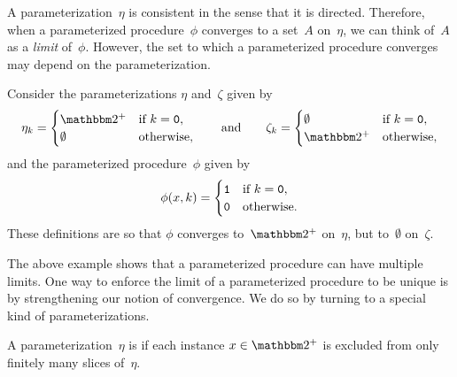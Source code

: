 A parameterization~$\eta$ is consistent in the sense that it is directed.
Therefore, when a parameterized procedure~$\phi$ converges to a set~$A$ on~$\eta$, we can think of~$A$ as a \emph{limit} of~$\phi$.
However, the set to which a parameterized procedure converges may depend on the parameterization.
\begin{example}
\label{ex:convergence}%
  Consider the parameterizations $\eta$ and~$\zeta$ given by
  \begin{equation*}
    \eta_k \deq \begin{cases}
      \binary^+	& \text{if $k = \bits{0}$}, \\
      \emptyset	& \text{otherwise},
    \end{cases}
    \qquad\text{and}\qquad
    \zeta_k \deq \begin{cases}
      \emptyset	& \text{if $k = \bits{0}$}, \\
      \binary^+	& \text{otherwise},
    \end{cases}
  \end{equation*}
  and the parameterized procedure~$\phi$ given by
  \begin{equation*}
    \phi(x, k) = \begin{cases}
      \textnormal{\texttt{1}}	& \text{if $k = \textnormal{\texttt{0}}$}, \\
      \textnormal{\texttt{0}}	& \text{otherwise}.
    \end{cases}
  \end{equation*}
  These definitions are so that $\phi$ converges to~$\binary^+$ on~$\eta$, but to~$\emptyset$ on~$\zeta$.
\end{example}

The above example shows that a parameterized procedure can have multiple limits.
One way to enforce the limit of a parameterized procedure to be unique is by strengthening our notion of convergence.
We do so by turning to a special kind of parameterizations.
\begin{definition}
  A parameterization~$\eta$ is  if each instance $x \in \binary^+$ is excluded from only finitely many slices of~$\eta$.
\end{definition}

